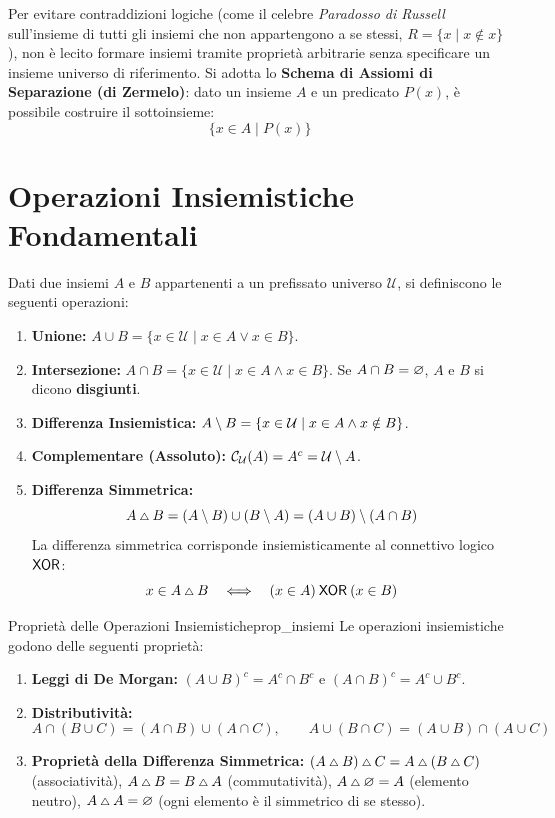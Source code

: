 Per evitare contraddizioni logiche (come il celebre \emph{Paradosso di Russell} sull'insieme di tutti gli insiemi che non appartengono a se stessi, $R = \{x \mid x \notin x\}$), non è lecito formare insiemi tramite proprietà arbitrarie senza specificare un insieme universo di riferimento. Si adotta lo \textbf{Schema di Assiomi di Separazione (di Zermelo)}: dato un insieme $A$ e un predicato $P(x)$, è possibile costruire il sottoinsieme:
\[
    \{x \in A \mid P(x)\}
\]

\section{Operazioni Insiemistiche Fondamentali}

Dati due insiemi $A$ e $B$ appartenenti a un prefissato universo $\mathcal{U}$, si definiscono le seguenti operazioni:
\begin{enumerate}
    \item \textbf{Unione:} $A \cup B = \{x \in \mathcal{U} \mid x \in A \vee x \in B\}$.
    \item \textbf{Intersezione:} $A \cap B = \{x \in \mathcal{U} \mid x \in A \wedge x \in B\}$. Se $A \cap B = \varnothing$, $A$ e $B$ si dicono \textbf{disgiunti}.
    \item \textbf{Differenza Insiemistica:} $A \setminus B = \{x \in \mathcal{U} \mid x \in A \wedge x \notin B\}$.
    \item \textbf{Complementare (Assoluto):} $\mathcal{C}_\mathcal{U}(A) = A^c = \mathcal{U} \setminus A$.
    \item \textbf{Differenza Simmetrica:}
    \[
        A \mathbin{\scriptstyle\triangle} B = (A \setminus B) \cup (B \setminus A) = (A \cup B) \setminus (A \cap B)
    \]
    La differenza simmetrica corrisponde insiemisticamente al connettivo logico $\mathbin{\mathsf{XOR}}$:
    \[
        x \in A \mathbin{\scriptstyle\triangle} B \quad \Longleftrightarrow \quad (x \in A) \mathbin{\mathsf{XOR}} (x \in B)
    \]
\end{enumerate}

\begin{teorema}{Proprietà delle Operazioni Insiemistiche}{prop_insiemi}
Le operazioni insiemistiche godono delle seguenti proprietà:
\begin{enumerate}
    \item \textbf{Leggi di De Morgan:} $(A \cup B)^c = A^c \cap B^c$ \quad e \quad $(A \cap B)^c = A^c \cup B^c$.
    \item \textbf{Distributività:} 
    \[
        A \cap (B \cup C) = (A \cap B) \cup (A \cap C), \qquad A \cup (B \cap C) = (A \cup B) \cap (A \cup C)
    \]
    \item \textbf{Proprietà della Differenza Simmetrica:} $(A \mathbin{\scriptstyle\triangle} B) \mathbin{\scriptstyle\triangle} C = A \mathbin{\scriptstyle\triangle} (B \mathbin{\scriptstyle\triangle} C)$ (associatività), $A \mathbin{\scriptstyle\triangle} B = B \mathbin{\scriptstyle\triangle} A$ (commutatività), $A \mathbin{\scriptstyle\triangle} \varnothing = A$ (elemento neutro), $A \mathbin{\scriptstyle\triangle} A = \varnothing$ (ogni elemento è il simmetrico di se stesso).
\end{enumerate}
\end{teorema}

